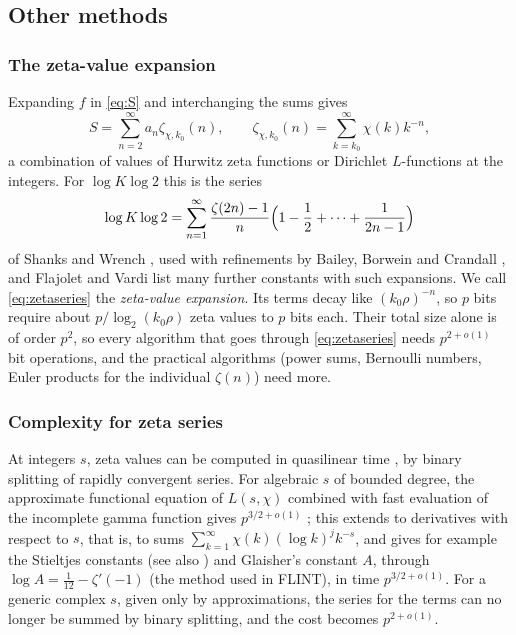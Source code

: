 \documentclass[11pt,reqno]{amsart}
\theoremstyle{definition}
\theoremstyle{remark}
\begin{document}
\subsection{Other methods}\label{sec:related}

\subsubsection{The zeta-value expansion}
Expanding $f$ in \eqref{eq:S} and interchanging the sums gives
\begin{equation}\label{eq:zetaseries}
  S = \sum_{n=2}^{\infty} a_n \zeta_{\chi, k_0}(n), \qquad \zeta_{\chi,k_0}(n) = \sum_{k=k_0}^{\infty} \chi(k) k^{-n},
\end{equation}
a combination of values of Hurwitz zeta functions or Dirichlet $L$-functions at the integers. For $\log K\log 2$ this
is the series
\[
  \log K\log 2 = \sum_{n=1}^{\infty} \frac{\zeta(2n)-1}{n} \Bigl(1 - \frac12 + \cdots + \frac{1}{2n-1}\Bigr)
\]
of Shanks and Wrench \cite{SW59}, used with refinements by Bailey, Borwein and Crandall \cite{BBC97}, and Flajolet and
Vardi \cite{FV96} list many further constants with such expansions. We call \eqref{eq:zetaseries} the
\emph{zeta-value expansion}. Its terms decay like $(k_0\rho)^{-n}$, so $p$ bits require about $p/\log_2(k_0\rho)$
zeta values to $p$ bits each. Their total size alone is of order $p^2$, so every algorithm that goes through
\eqref{eq:zetaseries} needs $p^{2+o(1)}$ bit operations, and the practical algorithms (power sums, Bernoulli
numbers, Euler products for the individual $\zeta(n)$) need more.

\subsubsection{Complexity for zeta series}
At integers $s$, zeta values can be computed in quasilinear time \cite{Kar95,Kar98}, by binary splitting of rapidly
convergent series. For algebraic $s$ of bounded degree, the approximate functional equation of $L(s,\chi)$ combined
with fast evaluation of the incomplete gamma function gives $p^{3/2+o(1)}$ \cite{Joh21}; this extends to
derivatives with respect to $s$, that is, to sums $\sum_{k=1}^{\infty} \chi(k)(\log k)^j k^{-s}$, and gives for example the
Stieltjes constants (see also \cite{Cof14}) and Glaisher's constant $A$, through $\log A = \frac1{12} - \zeta'(-1)$
(the method used in FLINT), in time $p^{3/2+o(1)}$. For a generic complex $s$, given only by approximations, the series for the terms can no longer be
summed by binary splitting, and the cost becomes $p^{2+o(1)}$.
\end{document}
